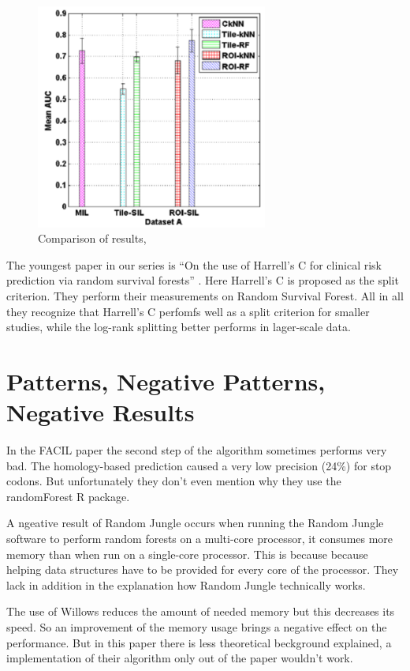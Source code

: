 \documentclass{sig-alternate-05-2015}
\begin{document}
\begin{figure}
\centering
\includegraphics[width=3in]{mildataa}
\caption{Comparison of results, \cite{maken2014multiple}}
\label{fig:mildataa}
\end{figure}

The youngest paper in our series is ``On the use of Harrell's C for clinical risk prediction via random survival forests'' \cite{Schmid2016450}. Here Harrell's C is proposed as the split criterion. They perform their measurements on Random Survival Forest.
All in all they recognize that  Harrell's C perfomfs well as a split criterion for smaller studies, while the log-rank splitting better performs in lager-scale data. 

\section{Patterns, Negative Patterns, Negative Results}
In the FACIL paper the second step of the algorithm sometimes performs very bad. The homology-based prediction caused a very low precision (24\%) for stop codons. But unfortunately they don't even mention why they use the randomForest R package.

A ngeative result of Random Jungle occurs when running the Random Jungle software to perform random forests on a multi-core processor, it consumes more memory than when run on a single-core processor. This is because because helping data structures have to be provided for every core of the processor. They lack in addition in the explanation how Random Jungle technically works.

The use of Willows reduces the amount of needed memory but this decreases its speed. So an improvement of the memory usage  brings a negative effect on the performance. But in this paper there is less theoretical beckground explained, a implementation of their algorithm only out of the paper wouldn't work.
\end{document}
